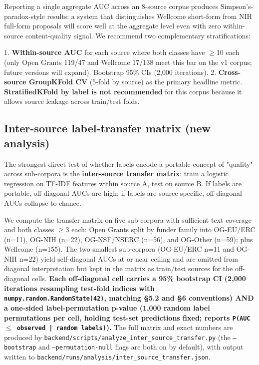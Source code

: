 \documentclass[11pt]{article}
\begin{document}
Reporting a single aggregate AUC across an 8-source corpus produces Simpson's-paradox-style results: a system that distinguishes Wellcome short-form from NIH full-form proposals will score well at the aggregate level even with zero within-source content-quality signal. We recommend two complementary stratifications:

1. \textbf{Within-source AUC} for each source where both classes have $\geq$10 each (only Open Grants 119/47 and Wellcome 17/138 meet this bar on the v1 corpus; future versions will expand). Bootstrap 95\% CIs (2,000 iterations).
2. \textbf{Cross-source GroupKFold CV} (5-fold by source) as the primary headline metric. \textbf{StratifiedKFold by label is not recommended} for this corpus because it allows source leakage across train/test folds.

\subsection{Inter-source label-transfer matrix (new analysis)}

The strongest direct test of whether labels encode a portable concept of "quality" across sub-corpora is the \textbf{inter-source transfer matrix}: train a logistic regression on TF-IDF features within source A, test on source B. If labels are portable, off-diagonal AUCs are high; if labels are source-specific, off-diagonal AUCs collapse to chance.

We compute the transfer matrix on five sub-corpora with sufficient text coverage and both classes $\geq$3 each: Open Grants split by funder family into OG-EU/ERC (n=11), OG-NIH (n=22), OG-NSF/NSERC (n=56), and OG-Other (n=59); plus Wellcome (n=155). The two smallest sub-corpora (OG-EU/ERC n=11 and OG-NIH n=22) yield self-diagonal AUCs at or near ceiling and are omitted from diagonal interpretation but kept in the matrix as train/test sources for the off-diagonal cells. \textbf{Each off-diagonal cell carries a 95\% bootstrap CI (2,000 iterations resampling test-fold indices with \texttt{numpy.random.RandomState(42)}, matching §5.2 and §6 conventions) AND a one-sided label-permutation p-value (1,000 random label permutations per cell, holding test-set predictions fixed; reports \texttt{P(AUC $\leq$ observed | random labels)}).} The full matrix and exact numbers are produced by \texttt{backend/scripts/analyze\_inter\_source\_transfer.py} (the \texttt{--bootstrap} and \texttt{--permutation-null} flags are both on by default), with output written to \texttt{backend/runs/analysis/inter\_source\_transfer.json}.
\end{document}
